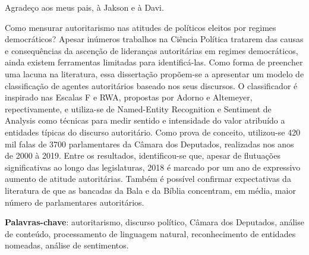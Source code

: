 \documentclass[
12pt,				%
openright,			%
twoside,			%
a4paper,			%
english,			%
french,				%
spanish,			%
brazil				%
]{abntex2}
\begin{document}
\begin{agradecimentos}
	Agradeço aos meus pais, à Jakson e à Davi.	
\end{agradecimentos}


\setlength{\absparsep}{18pt} %
\begin{resumo}
	Como mensurar autoritarismo nas atitudes de políticos eleitos por regimes democráticos? Apesar inúmeros trabalhos na Ciência Política tratarem das causas e consequências da ascenção de lideranças autoritárias em regimes democráticos, ainda existem ferramentas limitadas para identificá-las. Como forma de preencher uma lacuna na literatura, essa dissertação propõem-se a apresentar um modelo de classificação de agentes autoritários baseado nos seus discursos. O classificador é inspirado nas Escalas F e RWA, propostas por Adorno e Altemeyer, repectivamente, e utiliza-se de Named-Entity Recognition e Sentiment de Analysis como técnicas para medir sentido e intensidade do valor atribuído a entidades típicas do discurso autoritário. Como prova de conceito, utilizou-se 420 mil falas de 3700 parlamentares da Câmara dos Deputados, realizadas nos anos de 2000 à 2019. Entre os resultados, identificou-se que, apesar de flutuações significativas ao longo das legislaturas, 2018 é marcado por um ano de expressivo aumento de atitude autoritárias. Também é possível confirmar expectativas da literatura de que as bancadas da Bala e da Bíblia concentram, em média, maior número de parlamentares autoritários.

	\textbf{Palavras-chave}: autoritarismo, discurso político, Câmara dos Deputados, análise de conteúdo, processamento de linguagem natural, reconhecimento de entidades nomeadas, análise de sentimentos.
\end{resumo}
\end{document}
